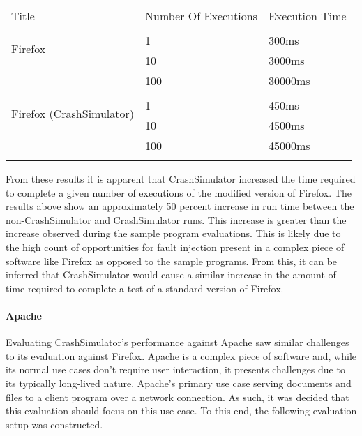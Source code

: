                 \begin{table}[H]
                    \scriptsize{}
                    \begin{tabular}{l l l}
                        \toprule{}
                        Title & Number Of Executions & Execution Time \\
                        \multirow{3}{*}{Firefox} \\
                        & 1 & 300ms \\
                        & 10 & 3000ms \\
                        & 100 & 30000ms \\
                        \multirow{3}{*}{Firefox (CrashSimulator)} \\
                        & 1 & 450ms \\
                        & 10 & 4500ms \\
                        & 100 & 45000ms \\
                        \bottomrule{}
                    \end{tabular}
                \end{table}

                From these results it is apparent that CrashSimulator  increased the time required to complete a given
                number of executions of the modified version of Firefox. The results above show an approximately 50
                percent increase in run time between the non-CrashSimulator and CrashSimulator runs. This increase is
                greater than the increase observed during the sample program evaluations. This is likely due to the high
                count of opportunities for fault injection present in a complex piece of software like Firefox as
                opposed to the sample programs. From this, it can be inferred that CrashSimulator would cause a similar
                increase in the amount of time required to complete a test of a standard version of Firefox.

            \paragraph{Apache}

                Evaluating CrashSimulator's performance against Apache saw similar challenges to its evaluation against
                Firefox. Apache is a complex piece of software and, while its normal use cases don't require user
                interaction, it presents challenges due to its typically long-lived nature. Apache's primary use case
                serving documents and files to a client program over a network connection. As such, it was decided that
                this evaluation should focus on this use case. To this end, the following evaluation setup was
                constructed.


